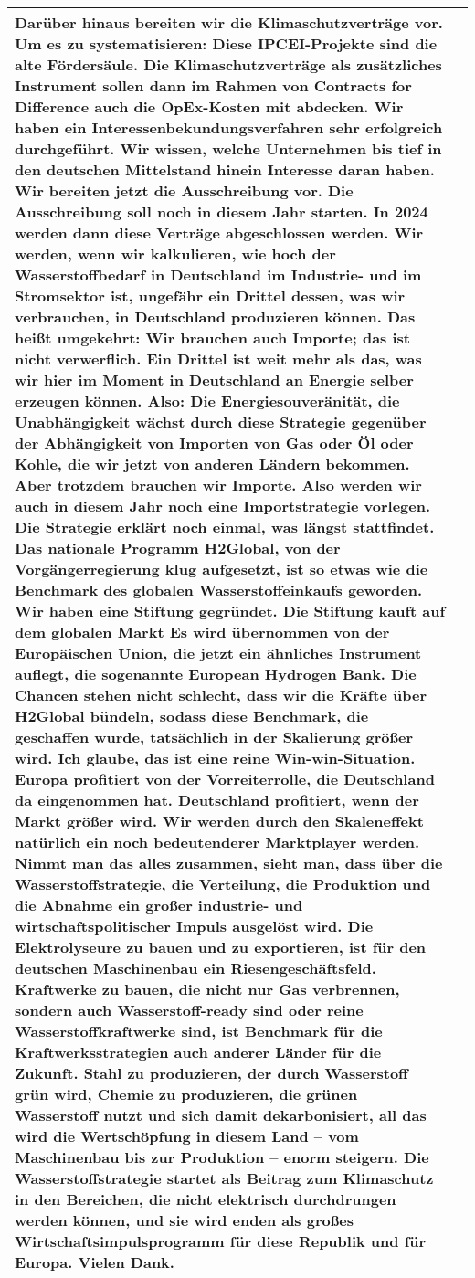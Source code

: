 \documentclass[
]{article}
\begin{document}
\begin{table}
\begin{tabular}[t]{l|>{\raggedright\arraybackslash}p{300in}}
Darüber hinaus bereiten wir die Klimaschutzverträge vor. Um es zu systematisieren: Diese IPCEI-Projekte sind die alte Fördersäule. Die Klimaschutzverträge als zusätzliches Instrument sollen dann im Rahmen von Contracts for Difference auch die OpEx-Kosten mit abdecken. Wir haben ein Interessenbekundungsverfahren sehr erfolgreich durchgeführt. Wir wissen, welche Unternehmen bis tief in den deutschen Mittelstand hinein Interesse daran haben. Wir bereiten jetzt die Ausschreibung vor. Die Ausschreibung soll noch in diesem Jahr starten. In 2024 werden dann diese Verträge abgeschlossen werden.
Wir werden, wenn wir kalkulieren, wie hoch der Wasserstoffbedarf in Deutschland im Industrie- und im Stromsektor ist, ungefähr ein Drittel dessen, was wir verbrauchen, in Deutschland produzieren können. Das heißt umgekehrt: Wir brauchen auch Importe; das ist nicht verwerflich. Ein Drittel ist weit mehr als das, was wir hier im Moment in Deutschland an Energie selber erzeugen können. Also: Die Energiesouveränität, die Unabhängigkeit wächst durch diese Strategie gegenüber der Abhängigkeit von Importen von Gas oder Öl oder Kohle, die wir jetzt von anderen Ländern bekommen.
Aber trotzdem brauchen wir Importe. Also werden wir auch in diesem Jahr noch eine Importstrategie vorlegen. Die Strategie erklärt noch einmal, was längst stattfindet. Das nationale Programm H2Global, von der Vorgängerregierung klug aufgesetzt, ist so etwas wie die Benchmark des globalen Wasserstoffeinkaufs geworden. Wir haben eine Stiftung gegründet. Die Stiftung kauft auf dem globalen Markt
Es wird übernommen von der Europäischen Union, die jetzt ein ähnliches Instrument auflegt, die sogenannte European Hydrogen Bank. Die Chancen stehen nicht schlecht, dass wir die Kräfte über H2Global bündeln, sodass diese Benchmark, die geschaffen wurde, tatsächlich in der Skalierung größer wird. Ich glaube, das ist eine reine Win-win-Situation. Europa profitiert von der Vorreiterrolle, die Deutschland da eingenommen hat. Deutschland profitiert, wenn der Markt größer wird. Wir werden durch den Skaleneffekt natürlich ein noch bedeutenderer Marktplayer werden.
Nimmt man das alles zusammen, sieht man, dass über die Wasserstoffstrategie, die Verteilung, die Produktion und die Abnahme ein großer industrie- und wirtschaftspolitischer Impuls ausgelöst wird. Die Elektrolyseure zu bauen und zu exportieren, ist für den deutschen Maschinenbau ein Riesengeschäftsfeld. Kraftwerke zu bauen, die nicht nur Gas verbrennen, sondern auch Wasserstoff-ready sind oder reine Wasserstoffkraftwerke sind, ist Benchmark für die Kraftwerksstrategien auch anderer Länder für die Zukunft. Stahl zu produzieren, der durch Wasserstoff grün wird, Chemie zu produzieren, die grünen Wasserstoff nutzt und sich damit dekarbonisiert, all das wird die Wertschöpfung in diesem Land – vom Maschinenbau bis zur Produktion – enorm steigern.
Die Wasserstoffstrategie startet als Beitrag zum Klimaschutz in den Bereichen, die nicht elektrisch durchdrungen werden können, und sie wird enden als großes Wirtschaftsimpulsprogramm für diese Republik und für Europa.
Vielen Dank.\\
\hline
\end{tabular}
\end{table}
\end{document}
